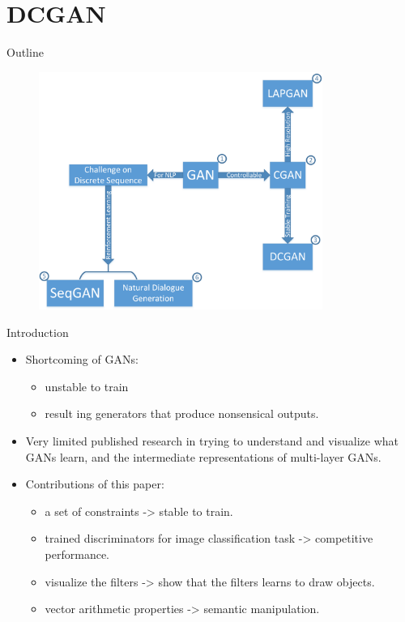 \documentclass[10pt]{beamer}
\newcommand{\subtitlepage}[3]{\title{#1}\subtitle{#2}\author{#3}\date{}\begin{frame}[plain]\titlepage\end{frame}}
\begin{document}
	\part{DCGAN}
	\begin{frame}{Outline}
		\begin{figure}
			\includegraphics[width=25em]{figures/outline.png}
		\end{figure}
	\end{frame}
	\subtitlepage{}{Unsupervised Representation Learning with Deep Convolutional Generative Adversarial Networks}{Alec Radford, Luke Metz, Soumith Chintala\\arXiv: 1511.06434}
	\begin{frame}{Introduction}
		\begin{itemize}
			\item Shortcoming of GANs:
			\begin{itemize}
				\item unstable to train
				\item result ing generators that produce nonsensical outputs.
			\end{itemize}
			\item Very limited published research in trying to understand and visualize what GANs learn, and the intermediate representations of multi-layer GANs.
			\item Contributions of this paper:
			\begin{itemize}
				\item a set of constraints -> stable to train.
				\item trained discriminators for image classification task -> competitive performance.
				\item visualize the filters -> show that the filters learns to draw objects.
				\item vector arithmetic properties -> semantic manipulation.
			\end{itemize}
		\end{itemize}
	\end{frame}
\end{document}
